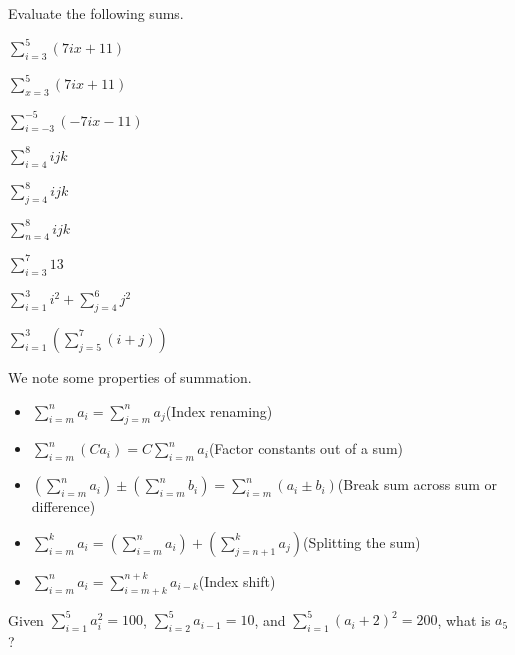 \begin{exercise}
    Evaluate the following sums.
    \begin{multicols}{3}
        \begin{partquestions}{\alph*}
            \item $\displaystyle \sum_{i=3}^{5}(7ix+11)$
            \item $\displaystyle \sum_{x=3}^{5}(7ix+11)$
            \item $\displaystyle \sum_{i=-3}^{-5}(-7ix-11)$
            \item $\displaystyle \sum_{i=4}^{8}ijk$
            \item $\displaystyle \sum_{j=4}^{8}ijk$
            \item $\displaystyle \sum_{n=4}^{8}ijk$
            \item $\displaystyle \sum_{i=3}^{7}13$
            \item $\displaystyle \sum_{i=1}^{3}i^2 + \sum_{j=4}^{6}j^2$
            \item $\displaystyle \sum_{i=1}^{3}\left(\sum_{j=5}^{7}(i+j)\right)$
        \end{partquestions}
    \end{multicols}
\end{exercise}

\newpage

We note some properties of summation.
\begin{itemize}
    \item $\displaystyle \sum_{i=m}^na_i = \sum_{j=m}^na_j$\hfill(Index renaming)
    \item $\displaystyle \sum_{i=m}^n(Ca_i) = C\sum_{i=m}^na_i$\hfill(Factor constants out of a sum)
    \item $\displaystyle \left(\sum_{i=m}^na_i\right) \pm \left(\sum_{i=m}^nb_i\right) = \sum_{i=m}^n(a_i \pm b_i)$\hfill(Break sum across sum or difference)
    \item $\displaystyle \sum_{i=m}^ka_i = \left(\sum_{i=m}^na_i\right) + \left(\sum_{j={n+1}}^ka_j\right)$\hfill(Splitting the sum)
    \item $\displaystyle \sum_{i=m}^na_i = \sum_{i=m+k}^{n+k}a_{i-k}$\hfill(Index shift)
\end{itemize}

\begin{exercise}
    Given $\displaystyle \sum_{i=1}^5a_i^2 = 100$, $\displaystyle \sum_{i=2}^5a_{i-1} = 10$, and $\displaystyle \sum_{i=1}^5(a_i+2)^2 = 200$, what is $a_5$?
\end{exercise}

